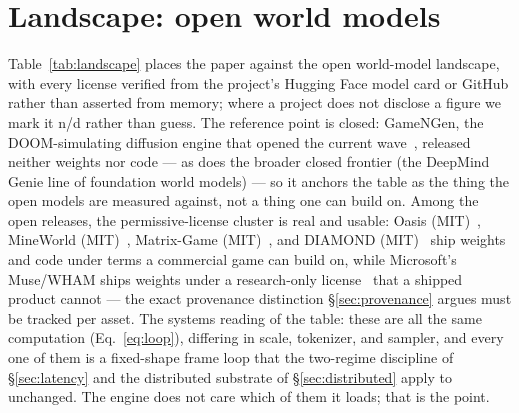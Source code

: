 \documentclass[11pt]{article}
\begin{document}
\section{Landscape: open world models}
\label{sec:landscape}

Table~\ref{tab:landscape} places the paper against the open world-model landscape, with every license verified
from the project's Hugging Face model card or GitHub  rather than asserted from memory; where a
project does not disclose a figure we mark it n/d rather than guess. The reference point is closed: GameNGen,
the DOOM-simulating diffusion engine that opened the current wave~\cite{gamengen}, released neither weights nor
code --- as does the broader closed frontier (the DeepMind Genie line of foundation world models) --- so it
anchors the table as the thing the open models are measured against, not a thing one can build on. Among the
open releases, the permissive-license cluster is real and usable: Oasis (MIT)~\cite{oasis}, MineWorld
(MIT)~\cite{mineworld}, Matrix-Game (MIT)~\cite{matrixgame}, and DIAMOND (MIT)~\cite{diamond} ship weights and
code under terms a commercial game can build on, while Microsoft's Muse/WHAM ships weights under a
research-only license~\cite{wham} that a shipped product cannot --- the exact provenance distinction
\S\ref{sec:provenance} argues must be tracked per asset. The systems reading of the table: these are all the
same computation (Eq.~\eqref{eq:loop}), differing in scale, tokenizer, and sampler, and every one of them is a
fixed-shape frame loop that the two-regime discipline of \S\ref{sec:latency} and the distributed substrate of
\S\ref{sec:distributed} apply to unchanged. The engine does not care which of them it loads; that is the point.
\end{document}
